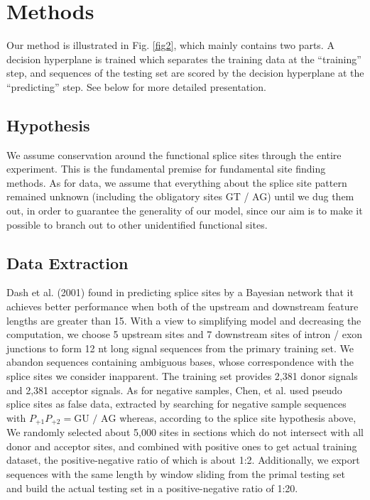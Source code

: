 \documentclass[journal,twoside]{IEEEtran}
\begin{document}
\section{Methods}\label{2}

Our method is illustrated in Fig. \ref{fig2}, which mainly contains two parts. A decision hyperplane is trained which separates the training data at the ``training'' step, and sequences of the testing set are scored by the decision hyperplane at the ``predicting'' step. See below for more detailed presentation. 

\subsection{Hypothesis}\label{2.1}

We assume conservation around the functional splice sites through the entire experiment. This is the fundamental premise for fundamental site finding methods. As for data, we assume that everything about the splice site pattern remained unknown (including the obligatory sites GT / AG) until we dug them out, in order to guarantee the generality of our model, since our aim is to make it possible to branch out to other unidentified functional sites. 

\subsection{Data Extraction}\label{2.2}

Dash et al. (2001) \cite{dash2001modeling} found in predicting splice sites by a Bayesian network that it achieves better performance when both of the upstream and downstream feature lengths are greater than 15. With a view to simplifying model and decreasing the computation, we choose 5 upstream sites and 7 downstream sites of intron / exon junctions to form 12 nt long signal sequences from the primary training set. We abandon sequences containing ambiguous bases, whose correspondence with the splice sites we consider inapparent. The training set provides 2,381 donor signals and 2,381 acceptor signals. As for negative samples, Chen, et al. \cite{chen2005prediction} used pseudo splice sites as false data, extracted by searching for negative sample sequences with $P_{+1}P_{+2} = \text{GU / AG}$ whereas, according to the splice site hypothesis above, We randomly selected about 5,000 sites in sections which do not intersect with all donor and acceptor sites, and combined with positive ones to get actual training dataset, the positive-negative ratio of which is about 1:2. Additionally, we export sequences with the same length by window sliding from the primal testing set and build the actual testing set in a positive-negative ratio of 1:20. 
\end{document}
